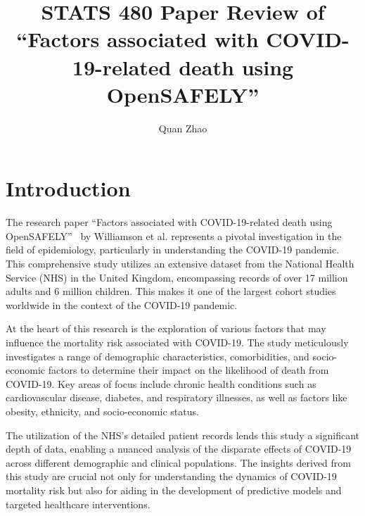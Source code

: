 \documentclass{article}
\begin{document}
\title{STATS 480 Paper Review of ``Factors associated with COVID-19-related
death using OpenSAFELY''}

\author{Quan Zhao}

\maketitle

\pagebreak



\section{Introduction}

The research paper ``Factors associated with COVID-19-related death using OpenSAFELY''~\cite{williamson2020factors} by Williamson et al. represents a pivotal investigation in the field of epidemiology, particularly in understanding the COVID-19 pandemic. This comprehensive study utilizes an extensive dataset from the National Health Service (NHS) in the United Kingdom, encompassing records of over 17 million adults and 6 million children. This makes it one of the largest cohort studies worldwide in the context of the COVID-19 pandemic.

At the heart of this research is the exploration of various factors that may influence the mortality risk associated with COVID-19. The study meticulously investigates a range of demographic characteristics, comorbidities, and socio-economic factors to determine their impact on the likelihood of death from COVID-19. Key areas of focus include chronic health conditions such as cardiovascular disease, diabetes, and respiratory illnesses, as well as factors like obesity, ethnicity, and socio-economic status.

The utilization of the NHS's detailed patient records lends this study a significant depth of data, enabling a nuanced analysis of the disparate effects of COVID-19 across different demographic and clinical populations. The insights derived from this study are crucial not only for understanding the dynamics of COVID-19 mortality risk but also for aiding in the development of predictive models and targeted healthcare interventions.
\end{document}
